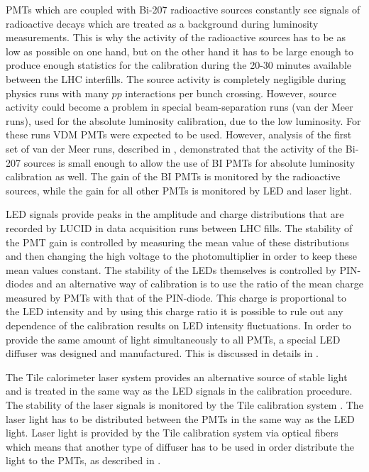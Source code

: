 PMTs which are coupled with Bi-207 radioactive sources constantly see signals of radioactive decays which are treated as a background
during luminosity measurements. This is why the activity of the radioactive sources has to be as low as possible on one hand, 
but on the other hand it has to be large enough to produce enough statistics for the calibration during the 20-30 minutes available between the LHC interfills.
The source activity is completely negligible during physics runs with many $pp$ interactions per bunch crossing. However, source activity could become 
a problem in special beam-separation runs (van der Meer runs), used for the absolute luminosity calibration, due to the low luminosity.
For these runs VDM PMTs were expected to be used. However, analysis of the first set of van der Meer runs, described in , 
demonstrated that the activity of the Bi-207 sources is small enough to allow the use of BI PMTs for absolute luminosity calibration as well. 
The gain of the BI PMTs is monitored by the radioactive sources, while the gain for all other PMTs is monitored by LED and laser light.

LED signals provide peaks in the amplitude and charge distributions that are recorded by LUCID in data acquisition runs between LHC fills.
The stability of the PMT gain is controlled by measuring the mean value of these distributions 
and then changing the high voltage to the photomultiplier in order to keep these mean values constant. 
The stability of the LEDs themselves is controlled by PIN-diodes and an alternative way of calibration is 
to use the ratio of the mean charge measured by PMTs with that of the PIN-diode. 
This charge is proportional to the LED intensity and by using this charge ratio it is possible to rule out any 
dependence of the calibration results on LED intensity fluctuations.
In order to provide the same amount of light simultaneously to all PMTs, a special LED diffuser was designed and manufactured.
This is discussed in details in .

The Tile calorimeter laser system provides an alternative source of stable light and is treated in the same way
as the LED signals in the calibration procedure. 
The stability of the laser signals is monitored by the Tile calibration system \cite{Aad:2008zzm}.
The laser light has to be distributed between the PMTs in the same way as the LED light.
Laser light is provided by the Tile calibration system via optical fibers which means that another type of diffuser
has to be used in order distribute the light to the PMTs, as described in .

